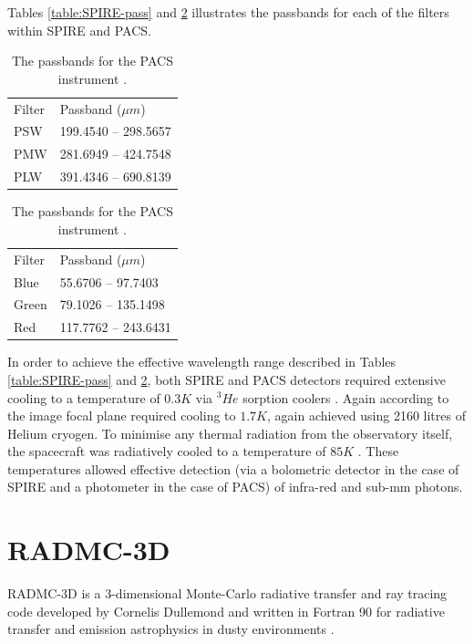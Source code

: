 \documentclass{report}
\begin{document}
Tables \ref{table:SPIRE-pass} and \ref{table:PACS-pass} illustrates the passbands for each of the filters within SPIRE and PACS.

\begin{table}[h]
  \parbox{.4\linewidth}{
  \centering
  \begin{tabular}{|l|l|}
  Filter & Passband ($\mu m$) \\
  PSW    &    199.4540 --	298.5657   \\
  PMW    &    281.6949 --	424.7548   \\
  PLW    &    391.4346 --	690.8139
  \end{tabular}
  \caption{The passbands (for extended source) for the SPIRE instrument \parencite{pass}.}
  \label{table:SPIRE-pass}
  }
  \parbox{.4\linewidth}{
  \centering
  \begin{tabular}{|l|l|}
  Filter & Passband ($\mu m$) \\
  Blue   &    55.6706 -- 97.7403       \\
  Green  &    79.1026 --	135.1498       \\
  Red    &    117.7762 --	243.6431
  \end{tabular}
  \caption{The passbands for the PACS instrument \parencite{pass}.}
  \label{table:PACS-pass}
  }
\end{table}

In order to achieve the effective wavelength range described in Tables \ref{table:SPIRE-pass} and \ref{table:PACS-pass}, both SPIRE and PACS detectors required extensive cooling to a temperature of $0.3 K$ via $^{3}{He}$ sorption coolers \parencite{herschel}. Again according to \textcite{herschel} the image focal plane required cooling to $1.7 K$, again achieved using 2160 litres of Helium cryogen. To minimise any thermal radiation from the observatory itself, the spacecraft was radiatively cooled to a temperature of $85 K$ \parencite{herschel}. These temperatures allowed effective detection (via a bolometric detector in the case of SPIRE and a photometer in the case of PACS) of infra-red and sub-mm photons.

\section{RADMC-3D} \label{radmc}
RADMC-3D is a 3-dimensional Monte-Carlo radiative transfer and ray tracing code developed by Cornelis Dullemond and written in Fortran 90 for radiative transfer and emission astrophysics in dusty environments \parencite{RADMC-3D}.
\end{document}
